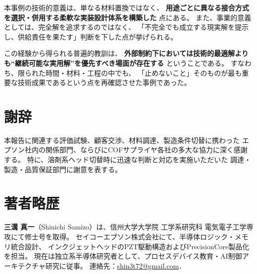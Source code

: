 \documentclass[conference]{IEEEtran}
\begin{document}
本事例の技術的意義は、単なる材料置換ではなく、  
\textbf{用途ごとに異なる接合方式を選択・併用する柔軟な実装設計体系を構築した}  
点にある。  
また、事業的意義としては、完全解を追求するのではなく、  
「不完全でも成立する現実解を提示し、供給責任を果たす」判断を下した点が挙げられる。  

この経験から得られる普遍的教訓は、  
\textbf{外部制約下においては技術的最適解よりも“継続可能な実用解”を優先すべき場面が存在する}  
ということである。  
すなわち、限られた時間・材料・工程の中でも、  
「止めないこと」そのものが最も重要な技術成果であるという点を再確認させた事例であった。

\section*{謝辞}

本報告に関連する評価試験、顧客交渉、材料調達、製造条件切替に携わった  
エプソン社内の関係部門、ならびにCOFサプライヤ各社の多大な協力に深く感謝する。  
特に、溶剤系ヘッド切替時に迅速な判断と対応を実施いただいた  
調達・製造・品質保証部門に謝意を表する。

\section*{著者略歴}

\textbf{三溝 真一}（Shinichi Samizo）は、信州大学大学院 工学系研究科 電気電子工学専攻にて修士号を取得。  
セイコーエプソン株式会社にて、半導体ロジック・メモリ統合設計、  
インクジェットヘッドのPZT駆動構造およびPrecisionCore製品化を担当。  
現在は独立系半導体研究者として、プロセスデバイス教育・AI制御アーキテクチャ研究に従事。  
連絡先：\href{mailto:shin3t72@gmail.com}{shin3t72@gmail.com}．
\end{document}
